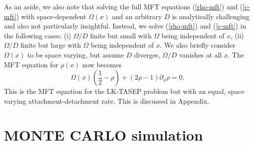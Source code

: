 \documentclass[aps,pre,twocolumn,superscriptaddress,amsmath,amssymb,longbibliography,floatfix,nofootinbib]{revtex4}
\begin{document}
As an aside, we also note that solving the full MFT equations (\ref{rho-mft}) and (\ref{c-mft}) with space-dependent $\Omega(x)$ and an arbitrary $D$ is analytically challenging and also not particularly insightful. Instead, we solve (\ref{rho-mft}) and (\ref{c-mft}) in the following cases: (i) $\Omega/D$ finite but small with $\Omega$ being independent of $x$, (ii) $\Omega/D$ finite but large with $\Omega$ being independent of $x$. We also briefly consider  $\Omega(x)$ to be space varying, but assume $D$ diverges, $\Omega/D$ vanishes at all $x$. The MFT equation for $\rho(x)$ now becomes
\begin{equation}
    \Omega(x)(\frac{1}{2}-\rho)+(2\rho-1)\partial_x\rho =0.\label{rho-mft-2}
\end{equation}
This is the MFT equation for the LK-TASEP problem but with an equal, space varying attachment-detachment rate. This is discussed in Appendix.

\section{MONTE CARLO simulation}\label{mcs}
\end{document}
